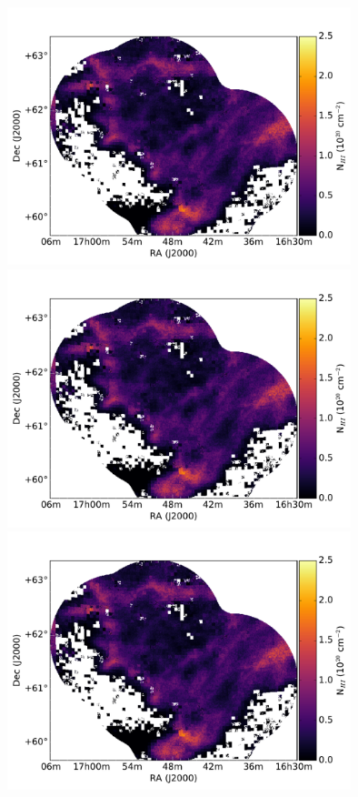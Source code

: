\documentclass[traditabstract]{aa}
\begin{document}
\begin{figure}[h]
  \centering
  \includegraphics[page=1,height=7.5cm,trim=45 5 65 35,clip=true]{Figures/DHIGLS_NHI.pdf}
  \hspace{3mm}
  \includegraphics[page=4,height=7.5cm,trim=45 5 65 35,clip=true]{Figures/DHIGLS_NHI.pdf} \\
  \vspace{3mm}
  \includegraphics[page=2,height=7.5cm,trim=45 5 65 35,clip=true]{Figures/DHIGLS_NHI.pdf}

\end{figure}
\end{document}
